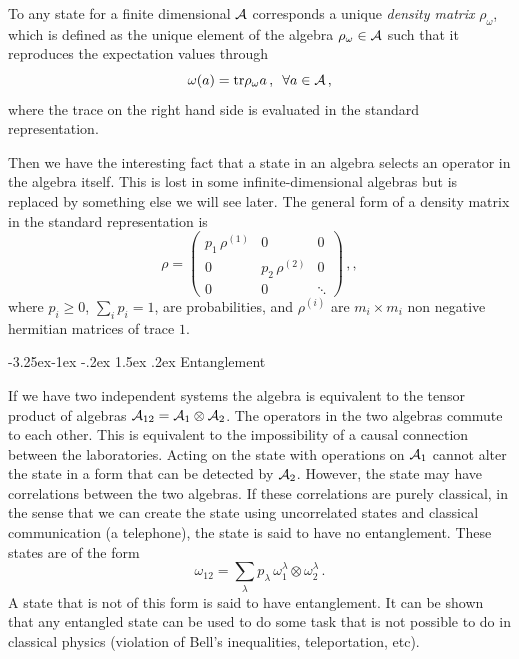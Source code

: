 \documentclass[11pt]{article}
\makeatletter
\renewcommand\subsection{\@startsection{subsection}{2}{\z@}%
                                   {-3.25ex\@plus -1ex \@minus -.2ex}%
                                     {1.5ex \@plus .2ex}%
                                     {\normalfont\bfseries}}
\numberwithin{equation}{section}
\newcommand{\be}{\begin{equation}}
\newcommand{\ee}{\end{equation}}
\makeatother
\begin{document}
To any state for a finite dimensional ${\cal A}$ corresponds a unique {\sl density matrix} $\rho_\omega$, which is defined as the unique element of the algebra $ \rho_\omega\in  {\cal A}$ such that it reproduces the expectation values through  
\begin{equation}
\omega (a)=\textrm{tr} \rho_\omega a\,, \,\,\,\forall a\in {\cal A}\,,
 \end{equation} 
where the trace on the right hand side is evaluated in the standard representation. 

Then we have the interesting fact that a state in an algebra selects an operator in the algebra itself. This is lost in some infinite-dimensional algebras but is replaced by something else we will see later.  
The general form of a density matrix in the standard representation is 
\begin{equation}
\rho= \left(\begin{array}{ccc}
  p_1\, \rho^{(1)} & 0 & 0 \\
  0 & p_2 \, \rho^{(2)} & 0\\
  0 & 0 & \ddots
\end{array}\right)\,,,\label{matrtr}
\end{equation}
where $p_i\ge 0$, $\sum_i p_i=1$, are probabilities, and $\rho^{(i)}$ are $m_i\times m_i$ non negative hermitian matrices of trace $1$. 

\subsection{Entanglement}

If we have two independent systems the algebra is equivalent to the tensor product of algebras ${\cal A}_{12}={\cal A}_1\otimes {\cal A}_2$. The operators in the two algebras commute to each other. This is equivalent to the impossibility of a causal connection between the laboratories. Acting on the state with operations on ${\cal A}_1$ cannot alter the state in a form that can be detected by ${\cal A}_2$. However, the state may have correlations between the two algebras. If these correlations are purely classical, in the sense that we can create the state using uncorrelated states and classical communication (a telephone), the state is said to have no entanglement. These states are of the form
\be
\omega_{12} = \sum_\lambda p_\lambda\, \omega_1^\lambda \otimes \omega_2^\lambda\,.
\ee
A state that is not of this form is said to have entanglement. It can be shown that any entangled state can be used to do some task that is not possible to do in classical physics (violation of Bell's inequalities, teleportation, etc). 
\end{document}
